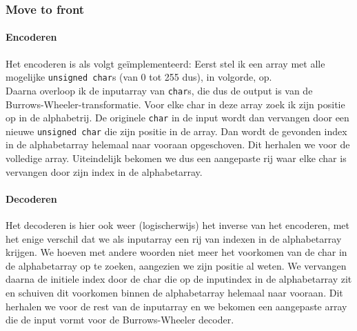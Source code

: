 \documentclass[11pt,a4paper]{article}
\begin{document}
\subsubsection{Move to front}

\paragraph*{Encoderen}
Het encoderen is als volgt ge\"implementeerd:
Eerst stel ik een array met alle mogelijke \texttt{unsigned char}s (van 0 tot 255 dus), in volgorde, op.\\
Daarna overloop ik de inputarray van \texttt{char}s, die dus de output is van de Burrows-Wheeler-transformatie. Voor elke char in deze array zoek ik zijn positie op in de alphabetrij. De originele \texttt{char} in de input wordt dan vervangen door een nieuwe \texttt{unsigned char} die zijn positie in de array. Dan wordt de gevonden index in de alphabetarray helemaal naar vooraan opgeschoven. Dit herhalen we voor de volledige array. Uiteindelijk bekomen we dus een aangepaste rij waar elke char is vervangen door zijn index in de alphabetarray.\\

\paragraph*{Decoderen}
Het decoderen is hier ook weer (logischerwijs) het inverse van het encoderen, met het enige verschil dat we als inputarray een rij van indexen in de alphabetarray krijgen. We hoeven met andere woorden niet meer het voorkomen van de char in de alphabetarray op te zoeken, aangezien we zijn positie al weten. We vervangen daarna de initiele index door de char die op de inputindex in de alphabetarray zit en schuiven dit voorkomen binnen de alphabetarray helemaal naar vooraan. Dit herhalen we voor de rest van de inputarray en we bekomen een aangepaste array die de input vormt voor de Burrows-Wheeler decoder.\\
\end{document}
